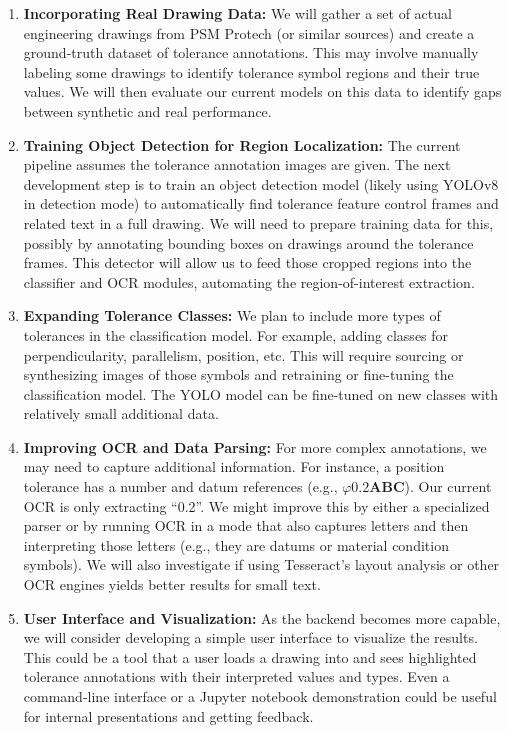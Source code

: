 \documentclass[11pt,a4paper]{article}
\begin{document}
\begin{enumerate}
  \item \textbf{Incorporating Real Drawing Data:} We will gather a set of actual engineering drawings from PSM Protech (or similar sources) and create a ground-truth dataset of tolerance annotations. This may involve manually labeling some drawings to identify tolerance symbol regions and their true values. We will then evaluate our current models on this data to identify gaps between synthetic and real performance.
  \item \textbf{Training Object Detection for Region Localization:} The current pipeline assumes the tolerance annotation images are given. The next development step is to train an object detection model (likely using YOLOv8 in detection mode) to automatically find tolerance feature control frames and related text in a full drawing. We will need to prepare training data for this, possibly by annotating bounding boxes on drawings around the tolerance frames. This detector will allow us to feed those cropped regions into the classifier and OCR modules, automating the region-of-interest extraction.
  \item \textbf{Expanding Tolerance Classes:} We plan to include more types of tolerances in the classification model. For example, adding classes for perpendicularity, parallelism, position, etc. This will require sourcing or synthesizing images of those symbols and retraining or fine-tuning the classification model. The YOLO model can be fine-tuned on new classes with relatively small additional data.
  \item \textbf{Improving OCR and Data Parsing:} For more complex annotations, we may need to capture additional information. For instance, a position tolerance has a number and datum references (e.g., $\varphi 0.2 \textbf{A}\textbf{B}\textbf{C}$). Our current OCR is only extracting “0.2”. We might improve this by either a specialized parser or by running OCR in a mode that also captures letters and then interpreting those letters (e.g., they are datums or material condition symbols). We will also investigate if using Tesseract’s layout analysis or other OCR engines yields better results for small text.
  \item \textbf{User Interface and Visualization:} As the backend becomes more capable, we will consider developing a simple user interface to visualize the results. This could be a tool that a user loads a drawing into and sees highlighted tolerance annotations with their interpreted values and types. Even a command-line interface or a Jupyter notebook demonstration could be useful for internal presentations and getting feedback.

\end{enumerate}
\end{document}
